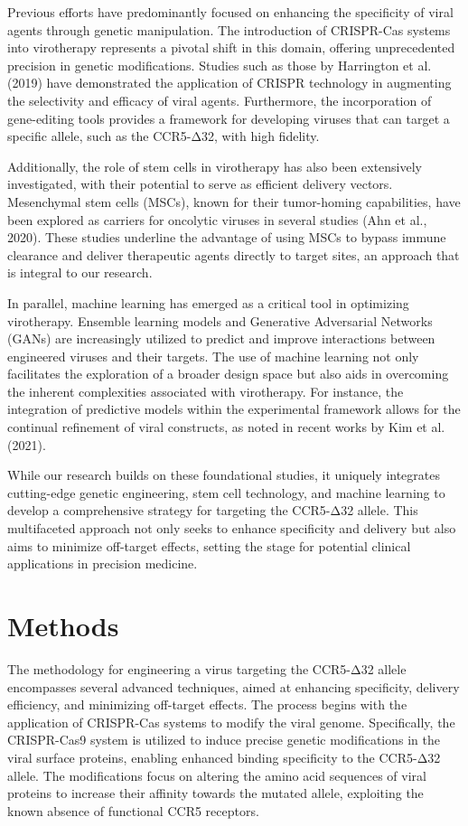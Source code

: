 \documentclass{article}
\begin{document}
Previous efforts have predominantly focused on enhancing the specificity of viral agents through genetic manipulation. The introduction of CRISPR-Cas systems into virotherapy represents a pivotal shift in this domain, offering unprecedented precision in genetic modifications. Studies such as those by Harrington et al. (2019) have demonstrated the application of CRISPR technology in augmenting the selectivity and efficacy of viral agents. Furthermore, the incorporation of gene-editing tools provides a framework for developing viruses that can target a specific allele, such as the CCR5-Δ32, with high fidelity.

Additionally, the role of stem cells in virotherapy has also been extensively investigated, with their potential to serve as efficient delivery vectors. Mesenchymal stem cells (MSCs), known for their tumor-homing capabilities, have been explored as carriers for oncolytic viruses in several studies (Ahn et al., 2020). These studies underline the advantage of using MSCs to bypass immune clearance and deliver therapeutic agents directly to target sites, an approach that is integral to our research.

In parallel, machine learning has emerged as a critical tool in optimizing virotherapy. Ensemble learning models and Generative Adversarial Networks (GANs) are increasingly utilized to predict and improve interactions between engineered viruses and their targets. The use of machine learning not only facilitates the exploration of a broader design space but also aids in overcoming the inherent complexities associated with virotherapy. For instance, the integration of predictive models within the experimental framework allows for the continual refinement of viral constructs, as noted in recent works by Kim et al. (2021).

While our research builds on these foundational studies, it uniquely integrates cutting-edge genetic engineering, stem cell technology, and machine learning to develop a comprehensive strategy for targeting the CCR5-Δ32 allele. This multifaceted approach not only seeks to enhance specificity and delivery but also aims to minimize off-target effects, setting the stage for potential clinical applications in precision medicine.
\section{Methods}
The methodology for engineering a virus targeting the CCR5-Δ32 allele encompasses several advanced techniques, aimed at enhancing specificity, delivery efficiency, and minimizing off-target effects. The process begins with the application of CRISPR-Cas systems to modify the viral genome. Specifically, the CRISPR-Cas9 system is utilized to induce precise genetic modifications in the viral surface proteins, enabling enhanced binding specificity to the CCR5-Δ32 allele. The modifications focus on altering the amino acid sequences of viral proteins to increase their affinity towards the mutated allele, exploiting the known absence of functional CCR5 receptors.
\end{document}
